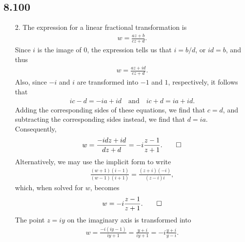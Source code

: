 \documentclass[a4paper,12pt]{article}
\begin{document}
\subsection*{8.100}
\begin{enumerate}
    \item[2.]
        The expression for a linear fractional transformation is
        \begin{align*}
            w = \frac{az + b}{cz + d}.
        \end{align*}
        Since $i$ is the image of $0$, the expression tells us that $i = b/d$, or $id = b$, and thus
        \begin{align*}
            w = \frac{az + id}{cz + d}.
        \end{align*}
        Also, since $-i$ and $i$ are transformed into $-1$ and $1$, respectively, it follows that
        \begin{align*}
            ic - d = -ia + id \quad \text{and} \quad ic + d = ia + id.
        \end{align*}
        Adding the corresponding sides of these equations, we find that $c = d$, and subtracting the corresponding sides instead, we find that $d = ia$. Consequently,
        \begin{align*}
            w = \frac{-idz + id}{dz + d} = -i \frac{z - 1}{z + 1}. \qed
        \end{align*}
        Alternatively, we may use the implicit form to write
        \begin{align*}
            \frac{(w + 1)(i - 1)}{(w - 1)(i + 1)} = \frac{(z + i)(-i)}{(z - i)i},
        \end{align*}
        which, when solved for $w$, becomes
        \begin{align*}
            w = -i\frac{z - 1}{z + 1}. \qed
        \end{align*}
        The point $z = iy$ on the imaginary axis is transformed into
        \begin{align*}
            w = \frac{-i(iy - 1)}{iy + 1} = \frac{y + i}{iy + 1} = -i\frac{y + i}{y - i}.
        \end{align*}
\end{enumerate}
\end{document}
